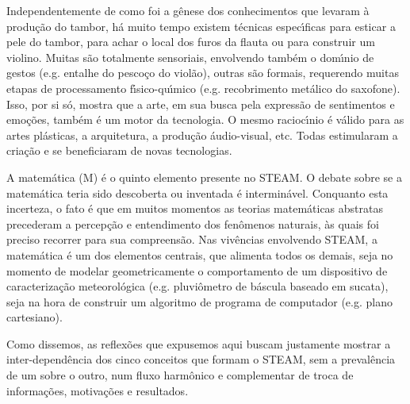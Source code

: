\documentclass[
12pt,		%
openright,	%
twoside,  %
a4paper,			%
chapter=TITLE,		%
english,			%
french,				%
spanish,			%
brazil				%
]{USPSC-classe/USPSC}
\begin{document}
Independentemente de como foi a g\^enese dos conhecimentos que levaram \`a produ\c{c}\~ao do tambor, h\'a muito tempo existem t\'ecnicas espec\'{\i}ficas para esticar a pele do tambor, para achar o local dos furos da flauta ou para construir um violino. Muitas s\~ao totalmente sensoriais, envolvendo tamb\'em o dom\'{\i}nio de gestos (e.g. entalhe do pesco\c{c}o do viol\~ao), outras s\~ao formais, requerendo muitas etapas de processamento f\'{\i}sico-qu\'{\i}mico (e.g. recobrimento met\'alico do saxofone). Isso, por si s\'o, mostra que a arte, em sua busca pela express\~ao de sentimentos e emo\c{c}\~oes, tamb\'em \'e um motor da tecnologia. O mesmo racioc\'{\i}nio \'e v\'alido para as artes pl\'asticas, a arquitetura, a produ\c{c}\~ao \'audio-visual, etc. Todas estimularam a cria\c{c}\~ao e se beneficiaram de novas tecnologias.

















A matem\'atica (M) \'e o quinto elemento presente no STEAM. O debate sobre se a matem\'atica teria sido descoberta ou inventada \'e intermin\'avel. Conquanto esta incerteza, o fato \'e que em muitos momentos as teorias matem\'aticas abstratas precederam a percep\c{c}\~ao e entendimento dos fen\^omenos naturais, \`as quais foi preciso recorrer para sua compreens\~ao. Nas viv\^encias envolvendo STEAM, a matem\'atica \'e um dos elementos centrais, que alimenta todos os demais, seja no momento de modelar geometricamente o comportamento de um dispositivo de caracteriza\c{c}\~ao meteorol\'ogica (e.g. pluvi\^ometro de b\'ascula baseado em sucata), seja na hora de construir um algoritmo de programa de computador (e.g. plano cartesiano).

















Como dissemos, as reflex\~oes que expusemos aqui buscam justamente mostrar a inter-depend\^encia dos cinco conceitos que formam o STEAM, sem a preval\^encia de um sobre o outro, num fluxo harm\^onico e complementar de troca de informa\c{c}\~oes, motiva\c{c}\~oes e resultados.
\end{document}
